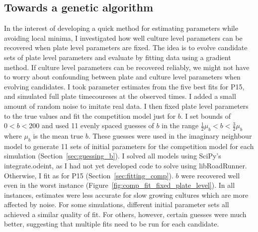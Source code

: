 \begin{multicols}{2}
\subsection{Towards a genetic algorithm}

In the interest of developing a quick method for estimating parameters
while avoiding local minima, I investigated how well culture level
parameters can be recovered when plate level parameters are fixed. The
idea is to evolve candidate sets of plate level parameters and
evaluate by fitting data using a gradient method. If culture level
parameters can be recovered reliably, we might not have to worry about
confounding between plate and culture level parameters when evolving
candidates. I took parameter estimates from the five best fits for
P15, and simulated full plate timecoureses at the observed times. I
added a small amount of random noise to imitate real data. I then
fixed plate level parameters to the true values and fit the
competition model just for \(b\). I set bounds of \(0 < b < 200\) and
used 11 evenly spaced guesses of \(b\) in the range
\(\frac{1}{2}\mu_{b} < b < \frac{3}{2}\mu_{b}\) where \(\mu_{b}\) is
the mean true \(b\). These guesses were used in the imaginary
neighbour model to generate 11 sets of initial parameters for the
competition model for each simulation
(Section~\ref{sec:guessing_b}). I solved all models using SciPy's
integrate.odeint, as I had not yet developed code to solve using
libRoadRunner. Otherwise, I fit as for P15
(Section~\ref{sec:fitting_comp}). \(b\) were recovered well even in
the worst instance (Figure~\ref{fig:comp_fit_fixed_plate_level}). In
all instances, estimates were less accurate for slow growing cultures
which are more affected by noise. For some simulations, different
initial parameter sets all achieved a similar quality of fit. For
others, however, certain guesses were much better, suggesting that
multiple fits need to be run for each candidate.


\end{multicols}
